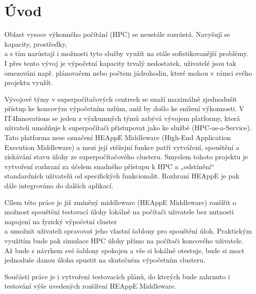 \chapter{Úvod}
\label{sec:Introduction}
Oblast vysoce výkonného počítání (HPC) se neustále rozrůstá. Navyšují se kapacity, prostředky, \\a s tím narůstají i možnosti tyto služby využít na stále sofistikovanější problémy. I přes tento vývoj je výpočetní kapacity trvalý nedostatek, uživatelé jsou tak omezováni např. plánovačem nebo počtem jádrohodin, které mohou v rámci svého projektu využít.

Vývojové týmy v superpočítačových centrech se snaží maximálně zjednodušit přístup ke koncovým výpočetním uzlům, aniž by došlo ke snížení výkonnosti. V IT4Innovations se jeden z výzkumných týmů zabývá vývojem platformy, která uživateli umožňuje k superpočítači přistupovat jako ke službě (HPC-as-a-Service). Tato platforma nese označení HEAppE Middleware (High-End Application Execution Middleware) a mezi její stěžejní funkce patří vytváření, spouštění a získávání stavu úlohy ze superpočítačového clusteru. Smyslem tohoto projektu je vytvoření rozhraní za účelem snadného přístupu k HPC a „odstínění“ standardních uživatelů od specifických funkcionalit. Rozhraní HEAppE je pak dále integrováno do dalších aplikací.

Cílem této práce je již zmíněný middleware (HEAppE Middleware) rozšířit o možnost spouštění testovací úlohy lokálně na počítači uživatele bez nutnosti napojení na fyzický výpočetní cluster \\a umožnit uživateli spravovat jeho vlastní šablony pro spouštění úloh. Praktickým využitím bude pak simulace HPC úlohy přímo na počítači koncového uživatele. Až bude s návrhem své šablony spokojen a vše si lokálně otestuje, bude si moct jednoduše danou úlohu spustit na skutečném výpočetním clusteru.

Součástí práce je i vytvoření testovacích plánů, do kterých bude zahrnuto i testování výše uvedených rozšíření HEAppE Middleware.
\endinput